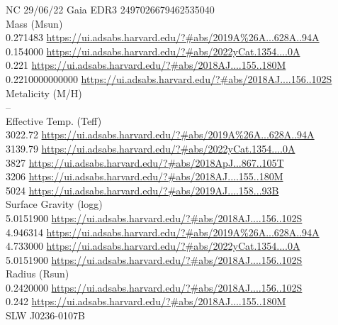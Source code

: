 NC 29/06/22
Gaia EDR3 2497026679462535040\\
Mass (Msun)\\
0.271483 \url{https://ui.adsabs.harvard.edu/?#abs/2019A%26A...628A..94A}\\
0.154000 \url{https://ui.adsabs.harvard.edu/?#abs/2022yCat.1354....0A}\\
0.221 \url{https://ui.adsabs.harvard.edu/?#abs/2018AJ....155..180M}\\
0.2210000000000 \url{https://ui.adsabs.harvard.edu/?#abs/2018AJ....156..102S}\\
Metalicity (M/H)\\
--\\
Effective Temp. (Teff)\\
3022.72 \url{https://ui.adsabs.harvard.edu/?#abs/2019A%26A...628A..94A}\\
3139.79 \url{https://ui.adsabs.harvard.edu/?#abs/2022yCat.1354....0A}\\
3827  \url{https://ui.adsabs.harvard.edu/?#abs/2018ApJ...867..105T}\\
3206 \url{https://ui.adsabs.harvard.edu/?#abs/2018AJ....155..180M}\\
5024 \url{https://ui.adsabs.harvard.edu/?#abs/2019AJ....158...93B}\\
Surface Gravity (logg)\\
5.0151900 \url{https://ui.adsabs.harvard.edu/?#abs/2018AJ....156..102S}\\
4.946314 \url{https://ui.adsabs.harvard.edu/?#abs/2019A%26A...628A..94A}\\
4.733000 \url{https://ui.adsabs.harvard.edu/?#abs/2022yCat.1354....0A}\\
5.0151900 \url{https://ui.adsabs.harvard.edu/?#abs/2018AJ....156..102S}\\
Radius (Rsun)\\
0.2420000 \url{https://ui.adsabs.harvard.edu/?#abs/2018AJ....156..102S}\\
0.242  \url{https://ui.adsabs.harvard.edu/?#abs/2018AJ....155..180M}\\


SLW J0236-0107B\\

